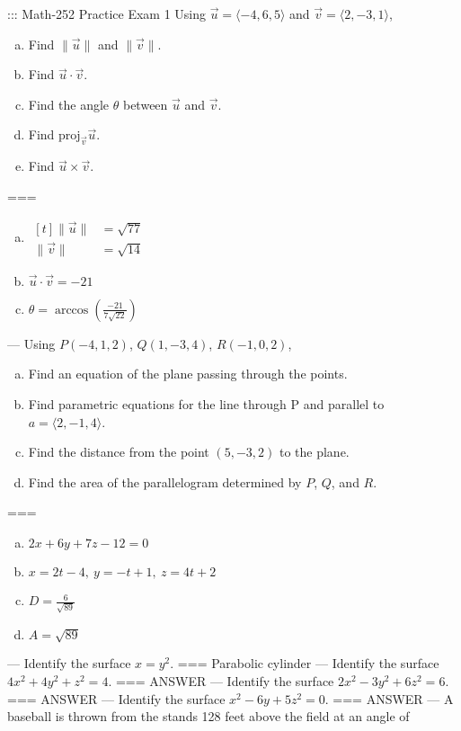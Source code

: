 ::: Math-252 Practice Exam 1
Using \(\vec u=\langle-4,6,5\rangle\) and \(\vec v=\langle 2,-3,1\rangle\),
\begin{enumerate}[a.]
  \item Find \(\|\vec u\|\) and \(\|\vec v\|\).
  \item Find \(\vec u\cdot\vec v\).
  \item Find the angle \(\theta\) between \(\vec u\) and \(\vec v\).
  \item Find \(\text{proj}_{\vec v}\vec u\).
  \item Find \(\vec u\times\vec v\).
\end{enumerate}
===
\begin{enumerate}[a.]
  \item
    \(\begin{aligned}[t]
      \|\vec u\|&=\sqrt{77} \\
      \|\vec v\|&=\sqrt{14}
    \end{aligned}\)
  \item \(\vec u\cdot\vec v=-21\)
  \item \(\theta=\arccos\left(\frac{-21}{7\sqrt{22}}\right)\)
\end{enumerate}
---
Using \(P(-4,1,2)\), \(Q(1,-3,4)\), \(R(-1,0,2)\),
\begin{enumerate}[a.]
  \item Find an equation of the plane passing through the points.
  \item Find parametric equations for the line through P and parallel to \(a=\langle 2,-1,4\rangle\).
  \item Find the distance from the point \((5,-3,2)\) to the plane.
  \item Find the area of the parallelogram determined by \(P\), \(Q\), and \(R\).
\end{enumerate}
===
\begin{enumerate}[a.]
  \item \(2x+6y+7z-12=0\)
  \item \(x=2t-4,\ y=-t+1,\ z=4t+2\)
  \item \(D=\frac{6}{\sqrt{89}}\)
  \item \(A=\sqrt{89}\)
\end{enumerate}
---
Identify the surface \(x=y^2\).
===
Parabolic cylinder
---
Identify the surface \(4x^2+4y^2+z^2=4\).
===
ANSWER
---
Identify the surface \(2x^2-3y^2+6z^2=6\).
===
ANSWER
---
Identify the surface \(x^2-6y+5z^2=0\).
===
ANSWER
---
A baseball is thrown from the stands 128 feet above the field at an angle of
